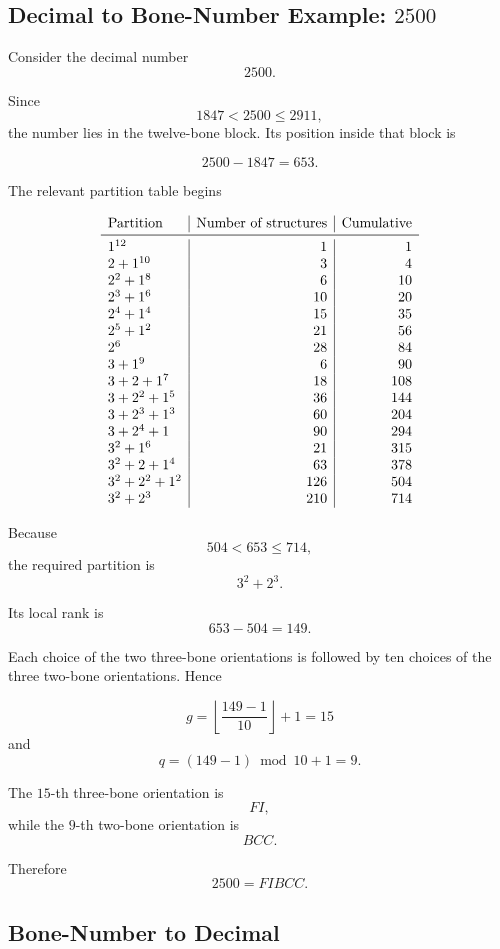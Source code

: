 \documentclass[11pt]{article}
\theoremstyle{remark}
\begin{document}
\subsection{Decimal to Bone-Number Example: \(2500\)}

Consider the decimal number
\[
2500.
\]

Since
\[
1847<2500\leq2911,
\]
the number lies in the twelve-bone block. Its position inside that block is

\[
2500-1847=653.
\]

The relevant partition table begins

\[
\begin{array}{l|r|r}
\text{Partition} & \text{Number of structures} & \text{Cumulative}\\
\midrule
1^{12} & 1 & 1\\
2+1^{10} & 3 & 4\\
2^2+1^8 & 6 & 10\\
2^3+1^6 & 10 & 20\\
2^4+1^4 & 15 & 35\\
2^5+1^2 & 21 & 56\\
2^6 & 28 & 84\\
3+1^9 & 6 & 90\\
3+2+1^7 & 18 & 108\\
3+2^2+1^5 & 36 & 144\\
3+2^3+1^3 & 60 & 204\\
3+2^4+1 & 90 & 294\\
3^2+1^6 & 21 & 315\\
3^2+2+1^4 & 63 & 378\\
3^2+2^2+1^2 & 126 & 504\\
3^2+2^3 & 210 & 714
\end{array}
\]

Because
\[
504<653\leq714,
\]
the required partition is
\[
3^2+2^3.
\]

Its local rank is
\[
653-504=149.
\]

Each choice of the two three-bone orientations is followed by ten choices of
the three two-bone orientations. Hence

\[
g
=
\left\lfloor\frac{149-1}{10}\right\rfloor+1
=
15
\]
and
\[
q
=
(149-1)\bmod10+1
=
9.
\]

The \(15\)-th three-bone orientation is
\[
FI,
\]
while the \(9\)-th two-bone orientation is
\[
BCC.
\]

Therefore
\[
\boxed{2500=FIBCC}.
\]

\subsection{Bone-Number to Decimal}
\end{document}
